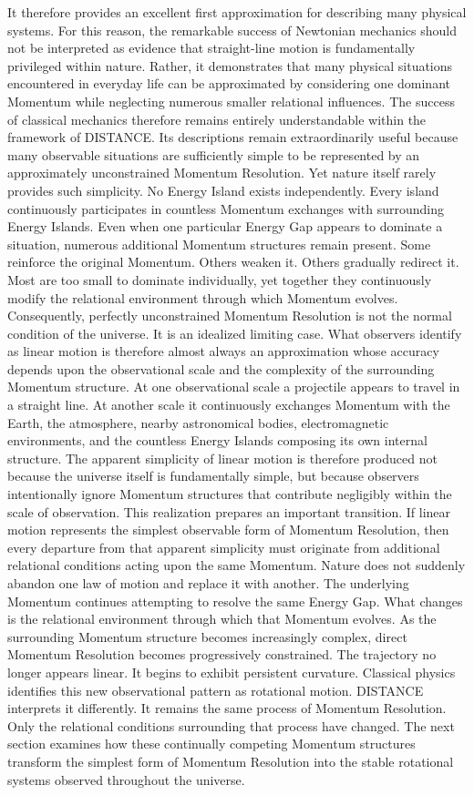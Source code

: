 It therefore provides an excellent first approximation for describing many physical systems.
For this reason, the remarkable success of Newtonian mechanics should not be interpreted as evidence that straight-line motion is fundamentally privileged within nature.
Rather, it demonstrates that many physical situations encountered in everyday life can be approximated by considering one dominant Momentum while neglecting numerous smaller relational influences.
The success of classical mechanics therefore remains entirely understandable within the framework of DISTANCE.
Its descriptions remain extraordinarily useful because many observable situations are sufficiently simple to be represented by an approximately unconstrained Momentum Resolution.
Yet nature itself rarely provides such simplicity.
No Energy Island exists independently.
Every island continuously participates in countless Momentum exchanges with surrounding Energy Islands.
Even when one particular Energy Gap appears to dominate a situation, numerous additional Momentum structures remain present.
Some reinforce the original Momentum.
Others weaken it.
Others gradually redirect it.
Most are too small to dominate individually, yet together they continuously modify the relational environment through which Momentum evolves.
Consequently, perfectly unconstrained Momentum Resolution is not the normal condition of the universe.
It is an idealized limiting case.
What observers identify as linear motion is therefore almost always an approximation whose accuracy depends upon the observational scale and the complexity of the surrounding Momentum structure.
At one observational scale a projectile appears to travel in a straight line.
At another scale it continuously exchanges Momentum with the Earth, the atmosphere, nearby astronomical bodies, electromagnetic environments, and the countless Energy Islands composing its own internal structure.
The apparent simplicity of linear motion is therefore produced not because the universe itself is fundamentally simple, but because observers intentionally ignore Momentum structures that contribute negligibly within the scale of observation.
This realization prepares an important transition.
If linear motion represents the simplest observable form of Momentum Resolution, then every departure from that apparent simplicity must originate from additional relational conditions acting upon the same Momentum.
Nature does not suddenly abandon one law of motion and replace it with another.
The underlying Momentum continues attempting to resolve the same Energy Gap.
What changes is the relational environment through which that Momentum evolves.
As the surrounding Momentum structure becomes increasingly complex, direct Momentum Resolution becomes progressively constrained.
The trajectory no longer appears linear.
It begins to exhibit persistent curvature.
Classical physics identifies this new observational pattern as rotational motion.
DISTANCE interprets it differently.
It remains the same process of Momentum Resolution.
Only the relational conditions surrounding that process have changed.
The next section examines how these continually competing Momentum structures transform the simplest form of Momentum Resolution into the stable rotational systems observed throughout the universe.

